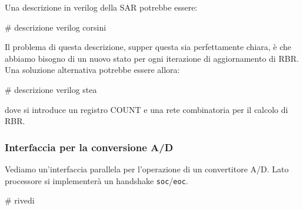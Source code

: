 \documentclass[a4paper,11pt]{article}
\begin{document}
Una descrizione in verilog della SAR potrebbe essere:

# descrizione verilog corsini

Il problema di questa descrizione, supper questa sia perfettamente chiara, è che abbiamo bisogno di un nuovo stato per ogni iterazione di aggiornamento di RBR.
Una soluzione alternativa potrebbe essere allora:

# descrizione verilog stea

dove si introduce un registro COUNT e una rete combinatoria per il calcolo di RBR.

\subsubsection{Interfaccia per la conversione A/D}
Vediamo un'interfaccia parallela per l'operazione di un convertitore A/D.
Lato processore si implementerà un handshake \lstinline|soc|/\lstinline|eoc|.

# rivedi
\end{document}
